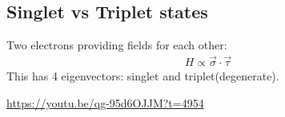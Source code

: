 \documentclass[]{article}
\begin{document}
\subsection{Singlet vs Triplet states}

Two electrons providing fields for each other:
\begin{align*}
	H \propto \vec{\sigma} \cdot \vec{\tau}
\end{align*}
This has 4 eigenvectors: singlet and triplet(degenerate).

\url{https://youtu.be/qg-95d6OJJM?t=4954}


\raggedright

\end{document}
